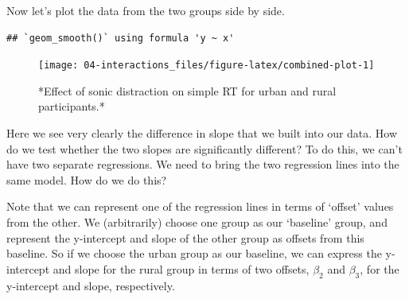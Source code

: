 \documentclass[]{book}
\newenvironment{Shaded}{\begin{snugshade}}{\end{snugshade}}
\newcommand{\DataTypeTok}[1]{\textcolor[rgb]{0.13,0.29,0.53}{#1}}
\newcommand{\KeywordTok}[1]{\textcolor[rgb]{0.13,0.29,0.53}{\textbf{#1}}}
\newcommand{\NormalTok}[1]{#1}
\newcommand{\OperatorTok}[1]{\textcolor[rgb]{0.81,0.36,0.00}{\textbf{#1}}}
\newcommand{\OtherTok}[1]{\textcolor[rgb]{0.56,0.35,0.01}{#1}}
\newcommand{\StringTok}[1]{\textcolor[rgb]{0.31,0.60,0.02}{#1}}
\begin{document}
Now let's plot the data from the two groups side by side.

\begin{Shaded}
\end{Shaded}

\begin{verbatim}
## `geom_smooth()` using formula 'y ~ x'
\end{verbatim}

\begin{figure}

{\centering \texttt{[image: 04-interactions\_files/figure-latex/combined-plot-1]} 

}

\caption{*Effect of sonic distraction on simple RT for urban and rural participants.*}\label{fig:combined-plot}
\end{figure}

Here we see very clearly the difference in slope that we built into our data. How do we test whether the two slopes are significantly different? To do this, we can't have two separate regressions. We need to bring the two regression lines into the same model. How do we do this?

Note that we can represent one of the regression lines in terms of `offset' values from the other. We (arbitrarily) choose one group as our `baseline' group, and represent the y-intercept and slope of the other group as offsets from this baseline. So if we choose the urban group as our baseline, we can express the y-intercept and slope for the rural group in terms of two offsets, \(\beta_2\) and \(\beta_3\), for the y-intercept and slope, respectively.
\end{document}
